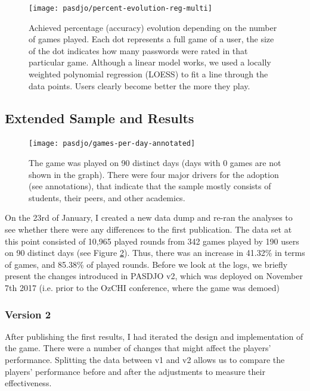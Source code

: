 \begin{figure}
	\centering
	\texttt{[image: pasdjo/percent-evolution-reg-multi]}
	\caption{\label{fig:pasdjo:percent-evolution} Achieved percentage (accuracy) evolution depending on the number of games played. Each dot represents a full game of a user, the size of the dot indicates how many passwords were rated in that particular game. Although a linear model works, we used a locally weighted polynomial regression (LOESS) to fit a line through the data points. Users clearly become better the more they play.}
\end{figure}


\subsection{Extended Sample and Results}
\begin{figure}
	\centering
	\texttt{[image: pasdjo/games-per-day-annotated]}
	\caption{\label{fig:pasdjo:games-1y} The game was played on 90 distinct days (days with 0 games are not shown in the graph). There were four major drivers for the adoption (see annotations), that indicate that the sample mostly consists of students, their peers, and other academics.}
\end{figure}

On the 23rd of January, I created a new data dump and re-ran the analyses to see whether there were any differences to the first publication. The data set at this point consisted of 10,965 played rounds from 342 games played by 190 users on 90 distinct days (see Figure \ref{fig:pasdjo:games-1y}). Thus, there was an increase in 41.32\% in terms of games, and 85.38\% of played rounds. Before we look at the logs, we briefly present the changes introduced in PASDJO v2, which was deployed on November 7th 2017 (i.e. prior to the OzCHI conference, where the game was demoed)

\subsubsection{Version 2}
After publishing the first results, I had iterated the design and implementation of the game. There were a number of changes that might affect the players' performance. Splitting the data between v1 and v2 allows us to compare the players' performance before and after the adjustments to measure their effectiveness. 

